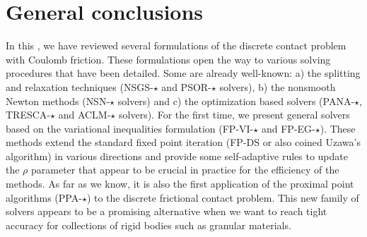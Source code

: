 


\section{General conclusions}

In this \chapterorreport{}, we have reviewed several formulations of the discrete  contact problem with Coulomb friction. These formulations open the way to various solving procedures that have been detailed. Some are already well-known: a) the  splitting and relaxation techniques ({\sf NSGS-$\star$} and {\sf PSOR-$\star$} solvers), b) the nonsmooth Newton methods ({\sf NSN-$\star$} solvers) and c) the optimization based solvers ({\sf PANA-$\star$, TRESCA-$\star$ and ACLM-$\star$} solvers). For the first time, we present general solvers based on the variational inequalities formulation ({\sf FP-VI-$\star$} and {\sf FP-EG-$\star$}). These methods extend the standard fixed point iteration ({\sf FP-DS} or also coined
Uzawa's algorithm) in various directions and provide some self-adaptive rules to update the $\rho$ parameter that appear to be crucial in practice for the efficiency of the methods. As far as we know, it is also the first application of the proximal point algorithms ({\sf PPA-$\star$}) to the discrete frictional contact problem.  This new family of solvers appears to be a promising alternative when we want to reach tight accuracy for collections of rigid bodies such as granular materials.

